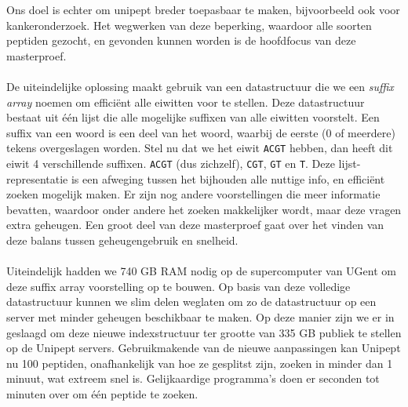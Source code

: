 Ons doel is echter om unipept breder toepasbaar te maken, bijvoorbeeld ook voor kankeronderzoek.
Het wegwerken van deze beperking, waardoor alle soorten peptiden gezocht, en gevonden kunnen worden is de hoofdfocus van deze masterproef.
\\ \\
De uiteindelijke oplossing maakt gebruik van een datastructuur die we een \textit{suffix array} noemen om efficiënt alle eiwitten voor te stellen.
Deze datastructuur bestaat uit één lijst die alle mogelijke suffixen van alle eiwitten voorstelt.
Een suffix van een woord is een deel van het woord, waarbij de eerste (0 of meerdere) tekens overgeslagen worden.
Stel nu dat we het eiwit \texttt{ACGT} hebben, dan heeft dit eiwit 4 verschillende suffixen.
\texttt{ACGT} (dus zichzelf), \texttt{CGT}, \texttt{GT} en \texttt{T}.
Deze lijst-representatie is een afweging tussen het bijhouden alle nuttige info, en efficiënt zoeken mogelijk maken.
Er zijn nog andere voorstellingen die meer informatie bevatten, waardoor onder andere het zoeken makkelijker wordt, maar deze vragen extra geheugen.
Een groot deel van deze masterproef gaat over het vinden van deze balans tussen geheugengebruik en snelheid.
\\ \\
Uiteindelijk hadden we 740 GB RAM nodig op de supercomputer van UGent om deze suffix array voorstelling op te bouwen.
Op basis van deze volledige datastructuur kunnen we slim delen weglaten om zo de datastructuur op een server met minder geheugen beschikbaar te maken.
Op deze manier zijn we er in geslaagd om deze nieuwe indexstructuur ter grootte van 335 GB publiek te stellen op de Unipept servers.
Gebruikmakende van de nieuwe aanpassingen kan Unipept nu 100 peptiden, onafhankelijk van hoe ze gesplitst zijn, zoeken in minder dan 1 minuut, wat extreem snel is.
Gelijkaardige programma's doen er seconden tot minuten over om één peptide te zoeken.
